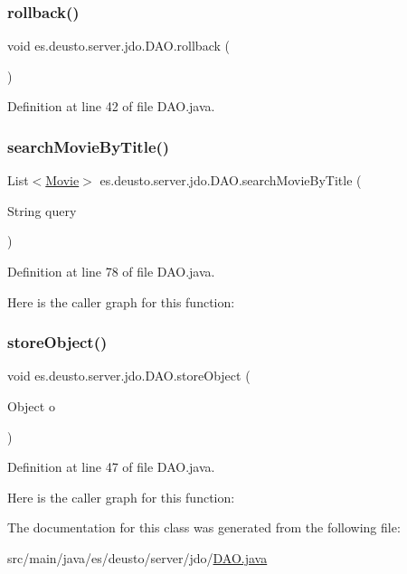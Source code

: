\subsubsection{\texorpdfstring{rollback()}{rollback()}}
{\footnotesize\ttfamily void es.\+deusto.\+server.\+jdo.\+D\+A\+O.\+rollback (\begin{DoxyParamCaption}{ }\end{DoxyParamCaption})}



Definition at line 42 of file D\+A\+O.\+java.

\mbox{\label{classes_1_1deusto_1_1server_1_1jdo_1_1_d_a_o_a58c4f711e3e60688619f8a065073f4ff}} 
\subsubsection{\texorpdfstring{searchMovieByTitle()}{searchMovieByTitle()}}
{\footnotesize\ttfamily List$<$\mbox{\hyperlink{classes_1_1deusto_1_1server_1_1jdo_1_1_movie}{Movie}}$>$ es.\+deusto.\+server.\+jdo.\+D\+A\+O.\+search\+Movie\+By\+Title (\begin{DoxyParamCaption}\item[{String}]{query }\end{DoxyParamCaption})}



Definition at line 78 of file D\+A\+O.\+java.

Here is the caller graph for this function\+:
\mbox{\label{classes_1_1deusto_1_1server_1_1jdo_1_1_d_a_o_a663255898c034b46536c8a9cd2b247f9}} 
\subsubsection{\texorpdfstring{storeObject()}{storeObject()}}
{\footnotesize\ttfamily void es.\+deusto.\+server.\+jdo.\+D\+A\+O.\+store\+Object (\begin{DoxyParamCaption}\item[{Object}]{o }\end{DoxyParamCaption})}



Definition at line 47 of file D\+A\+O.\+java.

Here is the caller graph for this function\+:


The documentation for this class was generated from the following file\+:\begin{DoxyCompactItemize}
\item 
src/main/java/es/deusto/server/jdo/\mbox{\hyperlink{_d_a_o_8java}{D\+A\+O.\+java}}\end{DoxyCompactItemize}
